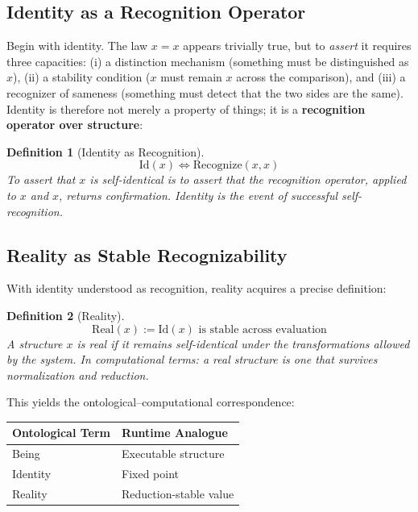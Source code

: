 \documentclass[12pt, letterpaper]{book}
\def\equiv{=}%
\newtheorem{definition}{Definition}[chapter]
\begin{document}
\subsection{Identity as a Recognition Operator}

Begin with identity. The law $x \equiv x$ appears trivially true, but to \textit{assert} it requires three capacities: (i) a distinction mechanism (something must be distinguished as $x$), (ii) a stability condition ($x$ must remain $x$ across the comparison), and (iii) a recognizer of sameness (something must detect that the two sides are the same). Identity is therefore not merely a property of things; it is a \textbf{recognition operator over structure}:

\begin{definition}[Identity as Recognition]\label{def:id-recognition}
\[
\mathrm{Id}(x) \iff \mathrm{Recognize}(x, x)
\]
To assert that $x$ is self-identical is to assert that the recognition operator, applied to $x$ and $x$, returns confirmation. Identity is the \textit{event} of successful self-recognition.
\end{definition}

\subsection{Reality as Stable Recognizability}

With identity understood as recognition, reality acquires a precise definition:

\begin{definition}[Reality]\label{def:reality}
\[
\mathrm{Real}(x) := \mathrm{Id}(x) \text{ is stable across evaluation}
\]
A structure $x$ is \textit{real} if it remains self-identical under the transformations allowed by the system. In computational terms: a real structure is one that survives normalization and reduction.
\end{definition}

This yields the ontological--computational correspondence:

\begin{center}
\begin{tabular}{ll}
\toprule
\textbf{Ontological Term} & \textbf{Runtime Analogue} \\
\midrule
Being & Executable structure \\
Identity & Fixed point \\
Reality & Reduction-stable value \\
\bottomrule
\end{tabular}
\end{center}
\end{document}
